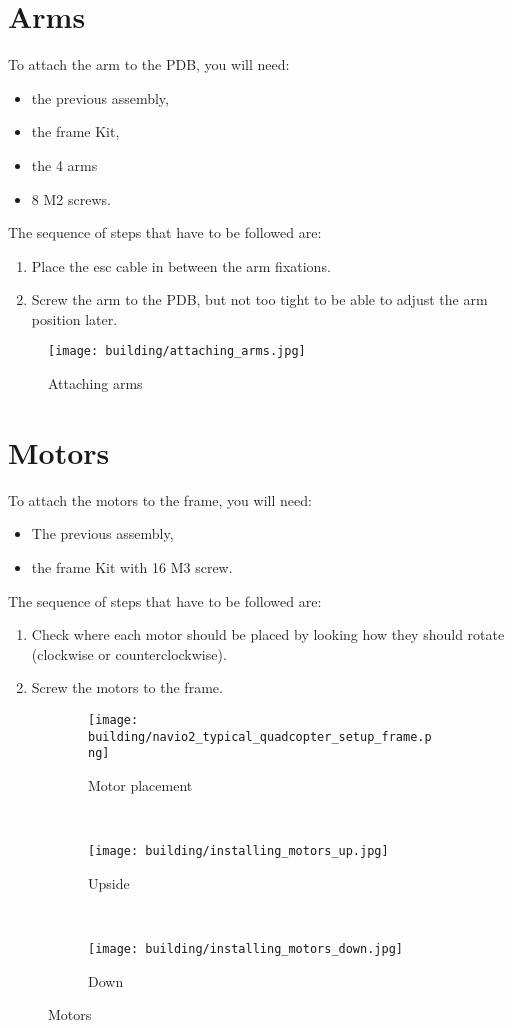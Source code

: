 \section{Arms}
To attach the arm to the PDB, you will need:
\begin{itemize}
    \item the previous assembly,
    \item the frame Kit,
    \item the 4 arms
    \item 8 M2 screws.
\end{itemize}
The sequence of steps that have to be followed are:
\begin{enumerate}
    \item Place the esc cable in between the arm fixations.
    \item Screw the arm to the PDB, but not too tight to be able to adjust the arm position later.
\end{enumerate}

\begin{figure}[!ht]
    \centering
    \texttt{[image: building/attaching\_arms.jpg]}
    \caption{Attaching arms}
    \label{fig:arms}
\end{figure}




\section{Motors}
To attach the motors to the frame, you will need:
\begin{itemize}
    \item The previous assembly,
    \item the frame Kit with 16 M3 screw.
\end{itemize}
The sequence of steps that have to be followed are:
\begin{enumerate}
    \item Check where each motor should be placed by looking how they should rotate (clockwise or counterclockwise).
    \item Screw the motors to the frame.
\end{enumerate}

\begin{figure}[!ht]
    \centering
    \begin{subfigure}[b]{0.3\textwidth}
        \texttt{[image: building/navio2\_typical\_quadcopter\_setup\_frame.png]}
        \caption{Motor placement}
        \label{fig:setup_frame}
    \end{subfigure}
    ~
    \begin{subfigure}[b]{0.3\textwidth}
        \texttt{[image: building/installing\_motors\_up.jpg]}
        \caption{Upside}
        \label{fig:motor_up}
    \end{subfigure}
    ~
    \begin{subfigure}[b]{0.3\textwidth}
        \texttt{[image: building/installing\_motors\_down.jpg]}
        \caption{Down}
        \label{fig:motor_down}
    \end{subfigure}
    \caption{Motors}\label{fig:Motors}
\end{figure}

